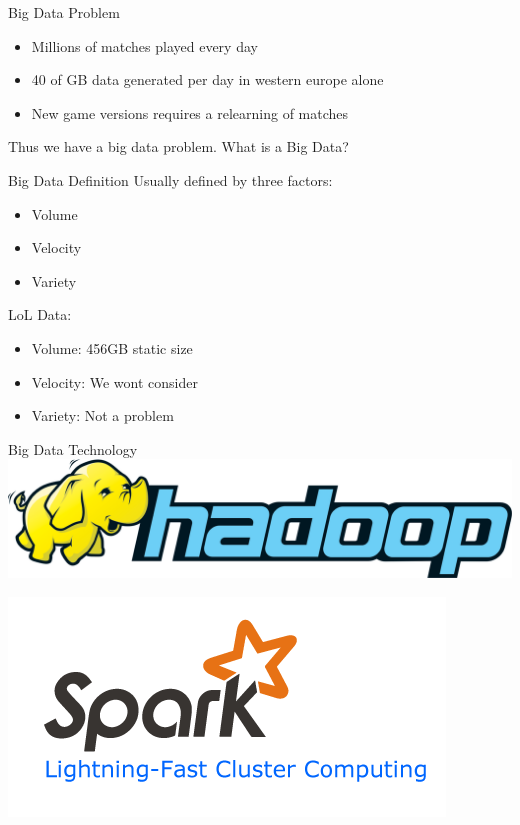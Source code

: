 \begin{frame}{Big Data Problem}
    \begin{itemize}
        \item Millions of matches played every day
        \item 40 of GB data generated per day in western europe alone
        \item New game versions requires a relearning of matches
    \end{itemize}
    Thus we have a big data problem. What is a Big Data?
\end{frame}

\begin{frame}{Big Data Definition}
    Usually defined by three factors:
    \begin{itemize}
        \item Volume
        \item Velocity
        \item Variety
    \end{itemize}
    LoL Data:
    \begin{itemize}
        \item Volume: 456GB static size
        \item Velocity: We wont consider
        \item Variety: Not a problem
    \end{itemize}
\end{frame}

\begin{frame}{Big Data Technology}
\centering \includegraphics[scale=0.4]{bigdataandcluster/hadoop.png}

\centering \includegraphics[scale=0.4]{bigdataandcluster/spark.png}
\end{frame}

